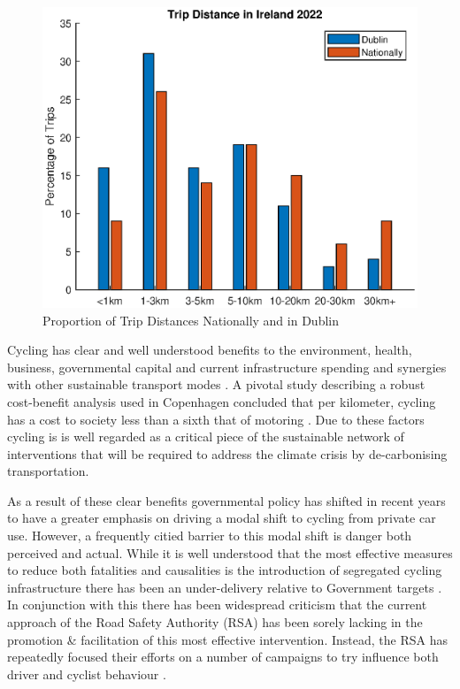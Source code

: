 \begin{figure}[hbt!]
    \centering
    \includegraphics[width=0.60\linewidth]{figures/Irish_trip_distance.eps}
    \caption{Proportion of Trip Distances Nationally and in Dublin \citep{ntaNationalHouseholdTravel2022}}
    \label{fig:TripDistances}
\end{figure}

Cycling has clear and well understood benefits to the environment, health, business, governmental capital and current infrastructure spending and synergies with other sustainable transport modes \citep{fraserCyclingTransportPublic2011,kagerCharacterisationReflectionsSynergy2016, dehartogHealthBenefitsCycling2010}. A pivotal study describing a robust cost-benefit analysis used in Copenhagen concluded that per kilometer, cycling has a cost to society less than a sixth that of motoring \citep{gosslingTransportTransitionsCopenhagen2015}. Due to these factors cycling is is well regarded as a critical piece of the sustainable network of interventions that will be required to address the climate crisis by de-carbonising transportation.

As a result of these clear benefits governmental policy has shifted in recent years to have a greater emphasis on driving a modal shift to cycling from private car use. However, a frequently citied barrier to this modal shift is danger both perceived and actual. While it is well understood that the most effective measures to reduce both fatalities and causalities is the introduction of segregated cycling infrastructure there has been an under-delivery relative to Government targets \cite{}. In conjunction with this there has been widespread criticism that the current approach of the Road Safety Authority (RSA) has been sorely lacking in the promotion \& facilitation of this most effective intervention. Instead, the RSA has repeatedly focused their efforts on a number of campaigns to try influence both driver and cyclist behaviour \citep{nugentCyclistsPedestriansAre2015, mcgreevyRoadCyclistsWe2024, rsaCyclistsCampaignRoad2022}.

